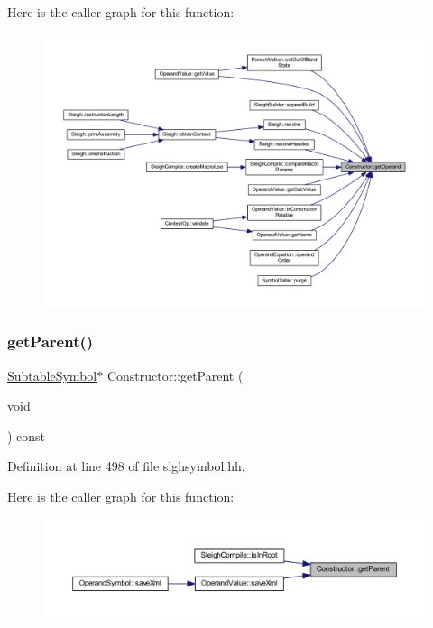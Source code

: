Here is the caller graph for this function\+:
\nopagebreak
\begin{figure}[H]
\begin{center}
\leavevmode
\includegraphics[width=350pt]{class_constructor_af59778488eafa4569c35b0c295be6f1f_icgraph}
\end{center}
\end{figure}
\mbox{\label{class_constructor_a613d5401723ad2cf2609431fafb29ccb}} 
\subsubsection{\texorpdfstring{getParent()}{getParent()}}
{\footnotesize\ttfamily \mbox{\hyperlink{class_subtable_symbol}{Subtable\+Symbol}}$\ast$ Constructor\+::get\+Parent (\begin{DoxyParamCaption}\item[{void}]{ }\end{DoxyParamCaption}) const\hspace{0.3cm}{\ttfamily [inline]}}



Definition at line 498 of file slghsymbol.\+hh.

Here is the caller graph for this function\+:
\nopagebreak
\begin{figure}[H]
\begin{center}
\leavevmode
\includegraphics[width=350pt]{class_constructor_a613d5401723ad2cf2609431fafb29ccb_icgraph}
\end{center}
\end{figure}
\mbox{\label{class_constructor_a76864bc33c064d3afeb0cbdf65a5648a}} 
